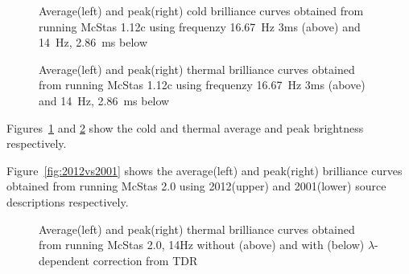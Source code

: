 \documentclass{elsarticle}
\begin{document}
\begin{figure}[h!]
\begin{minipage}{\linewidth}
\centering
{}
\caption{Average(left) and peak(right) cold brilliance curves obtained from running McStas 1.12c using frequenzy 16.67~Hz 3ms (above) and 14~Hz, 2.86~ms below}
\label{fig:2001}
\end{minipage}\hfill
\end{figure}


\begin{figure}[h!]
\begin{minipage}{\linewidth}
\centering
{}
\caption{Average(left) and peak(right) thermal brilliance curves obtained from running McStas 1.12c using frequenzy 16.67~Hz 3ms (above) and 14~Hz, 2.86~ms below}
\label{fig:2001_t}
\end{minipage}\hfill
\end{figure}


Figures~\ref{fig:2001} and \ref{fig:2001_t} show the cold and thermal average and peak brightness respectively.

Figure~\ref{fig:2012vs2001} shows the average(left) and peak(right) brilliance curves obtained from running McStas 2.0 using 2012(upper) and 2001(lower) source descriptions respectively.

\begin{figure}[h!]
\begin{minipage}{\linewidth}
\centering
{}
\caption{Average(left) and peak(right) thermal brilliance curves
  obtained from running McStas 2.0, 14Hz without (above) and with (below)
  $\lambda$-dependent correction from TDR }
\label{fig:2.0_cold}
\end{minipage}\hfill
\end{figure}
\end{document}
